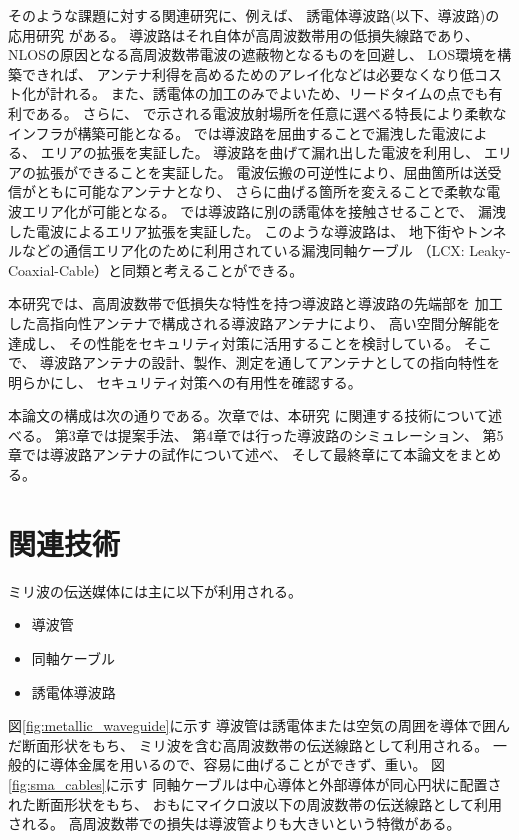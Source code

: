 \documentclass[technicalreport]{ieicej}
\begin{document}
そのような課題に対する関連研究に、例えば、
誘電体導波路(以下、導波路)の応用研究
\cite{bending_antenna} \cite{leaky_wave_antenna_bent_dielectric}
がある。
導波路はそれ自体が高周波数帯用の低損失線路であり、
NLOSの原因となる高周波数帯電波の遮蔽物となるものを回避し、
LOS環境を構築できれば、
アンテナ利得を高めるためのアレイ化などは必要なくなり低コスト化が計れる。
また、誘電体の加工のみでよいため、リードタイムの点でも有利である。
さらに、\cite{bending_antenna}
\cite{leaky_wave_antenna_bent_dielectric} \cite{pinching_antenna}
で示される電波放射場所を任意に選べる特長により柔軟なインフラが構築可能となる。
\cite{bending_antenna}では導波路を屈曲することで漏洩した電波による、
エリアの拡張を実証した。
導波路を曲げて漏れ出した電波を利用し、
エリアの拡張ができることを実証した。
電波伝搬の可逆性により、屈曲箇所は送受信がともに可能なアンテナとなり、
さらに曲げる箇所を変えることで柔軟な電波エリア化が可能となる。
\cite{leaky_wave_antenna_bent_dielectric} \cite{pinching_antenna}
では導波路に別の誘電体を接触させることで、
漏洩した電波によるエリア拡張を実証した。
このような導波路は、
地下街やトンネルなどの通信エリア化のために利用されている漏洩同軸ケーブル
（LCX: Leaky-Coaxial-Cable）と同類と考えることができる。

本研究では、高周波数帯で低損失な特性を持つ導波路と導波路の先端部を
加工した高指向性アンテナで構成される導波路アンテナにより、
高い空間分解能を達成し、
その性能をセキュリティ対策に活用することを検討している。
そこで、
導波路アンテナの設計、製作、測定を通してアンテナとしての指向特性を明らかにし、
セキュリティ対策への有用性を確認する。

本論文の構成は次の通りである。次章では、本研究
に関連する技術について述べる。
第3章では提案手法、
第4章では行った導波路のシミュレーション、
第5章では導波路アンテナの試作について述べ、
そして最終章にて本論文をまとめる。

\section{関連技術}

ミリ波の伝送媒体には主に以下が利用される。
\begin{itemize}
  \item 導波管
  \item 同軸ケーブル
  \item 誘電体導波路
\end{itemize}

図\ref{fig:metallic_waveguide}に示す
導波管は誘電体または空気の周囲を導体で囲んだ断面形状をもち、
ミリ波を含む高周波数帯の伝送線路として利用される。
一般的に導体金属を用いるので、容易に曲げることができず、重い。
図\ref{fig:sma_cables}に示す
同軸ケーブルは中心導体と外部導体が同心円状に配置された断面形状をもち、
おもにマイクロ波以下の周波数帯の伝送線路として利用される。
高周波数帯での損失は導波管よりも大きいという特徴がある。
\end{document}
